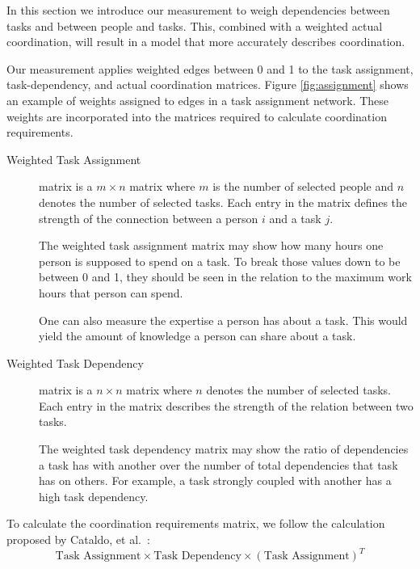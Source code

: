 \documentclass[times, 10pt,twocolumn]{article}
\begin{document}
In this section we introduce our measurement to weigh dependencies between tasks and between people and tasks.
This, combined with a weighted actual coordination, will result in a model that more accurately describes coordination.

\label{subsec:ourmeasure}

Our measurement applies weighted edges between 0 and 1 to the task assignment, task-dependency, and actual coordination matrices. Figure \ref{fig:assignment} shows an example of weights assigned to edges in a task assignment network. These weights are incorporated into the matrices required to calculate coordination requirements.

\begin{description}

\item[Weighted Task Assignment] matrix is a $m\times n$ matrix where $m$ is the number of selected people and $n$ denotes the number of selected tasks. 
Each entry in the matrix defines the strength of the connection between a person $i$ and a task $j$.

The weighted task assignment matrix may show how many hours one person is supposed to spend on a task. 
To break those values down to be between 0 and 1, they should be seen in the relation to the maximum work hours that person can spend.

One can also measure the expertise a person has about a task.
This would yield the amount of knowledge a person can share about a task.

\item[Weighted Task Dependency] matrix is a $n\times n$ matrix where $n$ denotes the number of selected tasks.
Each entry in the matrix describes the strength of the relation between two tasks.

The weighted task dependency matrix may show the ratio of dependencies a task has with another over the number of total dependencies that task has on others. 
For example, a task strongly coupled with another has a high task dependency.

\end{description}

To calculate the coordination requirements matrix, we follow the calculation proposed by Cataldo, et al.~\cite{cataldo2006:coordination_reqs}:
%
{\small$$\text{Task Assignment}\times\text{Task Dependency}\times\left(\text{Task Assignment}\right)^T$$}
%
\end{document}
